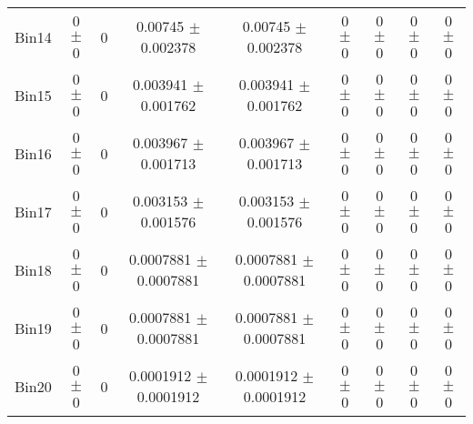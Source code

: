 \begin{tabular}{@{\extracolsep{4pt}}lcccccccc@{}}
     Bin14 & 0 $\pm$ 0 & 0 & 0.00745 $\pm$ 0.002378 & 0.00745 $\pm$ 0.002378 & 0 $\pm$ 0 & 0 $\pm$ 0 & 0 $\pm$ 0 & 0 $\pm$ 0 \\ 
     Bin15 & 0 $\pm$ 0 & 0 & 0.003941 $\pm$ 0.001762 & 0.003941 $\pm$ 0.001762 & 0 $\pm$ 0 & 0 $\pm$ 0 & 0 $\pm$ 0 & 0 $\pm$ 0 \\ 
     Bin16 & 0 $\pm$ 0 & 0 & 0.003967 $\pm$ 0.001713 & 0.003967 $\pm$ 0.001713 & 0 $\pm$ 0 & 0 $\pm$ 0 & 0 $\pm$ 0 & 0 $\pm$ 0 \\ 
     Bin17 & 0 $\pm$ 0 & 0 & 0.003153 $\pm$ 0.001576 & 0.003153 $\pm$ 0.001576 & 0 $\pm$ 0 & 0 $\pm$ 0 & 0 $\pm$ 0 & 0 $\pm$ 0 \\ 
     Bin18 & 0 $\pm$ 0 & 0 & 0.0007881 $\pm$ 0.0007881 & 0.0007881 $\pm$ 0.0007881 & 0 $\pm$ 0 & 0 $\pm$ 0 & 0 $\pm$ 0 & 0 $\pm$ 0 \\ 
     Bin19 & 0 $\pm$ 0 & 0 & 0.0007881 $\pm$ 0.0007881 & 0.0007881 $\pm$ 0.0007881 & 0 $\pm$ 0 & 0 $\pm$ 0 & 0 $\pm$ 0 & 0 $\pm$ 0 \\ 
     Bin20 & 0 $\pm$ 0 & 0 & 0.0001912 $\pm$ 0.0001912 & 0.0001912 $\pm$ 0.0001912 & 0 $\pm$ 0 & 0 $\pm$ 0 & 0 $\pm$ 0 & 0 $\pm$ 0 \\ 
\hline\hline
  \end{tabular}
